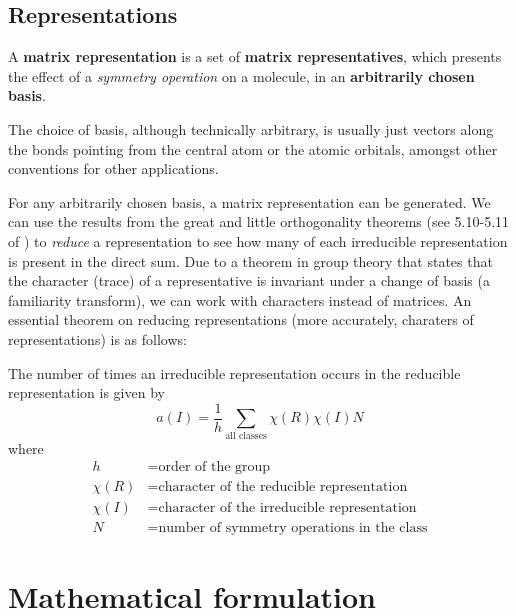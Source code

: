 \subsection{Representations}
\begin{defi}
A \textbf{matrix representation} is a set of \textbf{matrix representatives}, 
which presents the effect of a \textit{symmetry operation} on a molecule, 
in an \textbf{arbitrarily chosen basis}. 
\end{defi}
The choice of basis, although technically arbitrary, is usually just vectors along 
the bonds pointing from the central atom or the atomic orbitals, 
amongst other conventions for other applications. \par
For any arbitrarily chosen basis, a matrix representation can be generated. 
We can use the results from the great and little orthogonality theorems 
(see 5.10-5.11 of \cite{atkinsqm}) to \textit{reduce} a representation to 
see how many of each irreducible representation is present in the direct sum. 
Due to a theorem in group theory that states that the character (trace) of a 
representative is invariant under a change of basis (a familiarity transform), 
we can work with characters instead of matrices. 
An essential theorem on reducing representations 
(more accurately, charaters of representations) is as follows:
\begin{thrm}
The number of times an irreducible representation occurs in the reducible representation is given by
\begin{equation}
a(I)=\frac{1}{h}\sum_{\text{all classes}}\chi(R)\chi(I)N
\end{equation}
where
\begin{equation*}
\begin{aligned}
h&=\text{order of the group}\\
\chi(R)&=\text{character of the reducible representation}\\
\chi(I)&=\text{character of the irreducible representation}\\
N&=\text{number of symmetry operations in the class}
\end{aligned}
\end{equation*}
\end{thrm}
\section{Mathematical formulation}

